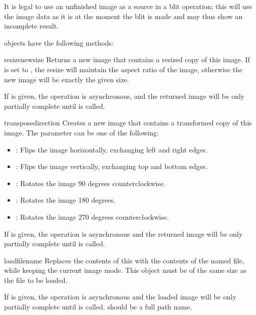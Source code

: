 It is legal to use an unfinished image as a source in a blit operation; this 
will use the image data as it is at the moment the blit is made and may thus 
show an incomplete result.

 objects have the following methods:

\begin{methoddesc}[Image]{resize}{newsize}
Returns a new image that contains a resized copy of this image. If 
 is set to , the resize will maintain the 
aspect ratio of the image, otherwise the new image will be exactly the given 
size. 

If  is given, the operation is asynchronous, and the 
returned image will be only partially complete until  is 
called.
\end{methoddesc}

\begin{methoddesc}[Image]{transpose}{direction}
Creates a new image that contains a transformed copy of this image. The 
 parameter can be one of the following:

\begin{itemize}
\item {}: Flips the image horizontally, exchanging left and right edges.
\item {}: Flips the image vertically, exchanging top and bottom edges.
\item {}: Rotates the image 90 degrees counterclockwise.
\item {}: Rotates the image 180 degrees.
\item {}: Rotates the image 270 degrees counterclockwise.
\end{itemize}

If  is given, the operation is asynchronous and the 
returned image will be only partially complete until  is 
called.
\end{methoddesc}

\begin{methoddesc}[Image]{load}{filename}
Replaces the contents of this  with the contents of the named 
file, while keeping the current image mode. This  object must 
be of the same size as the file to be loaded.

If  is given, the operation is asynchronous and the loaded 
image will be only partially complete until  is called. 
 should be a full path name.
\end{methoddesc}

